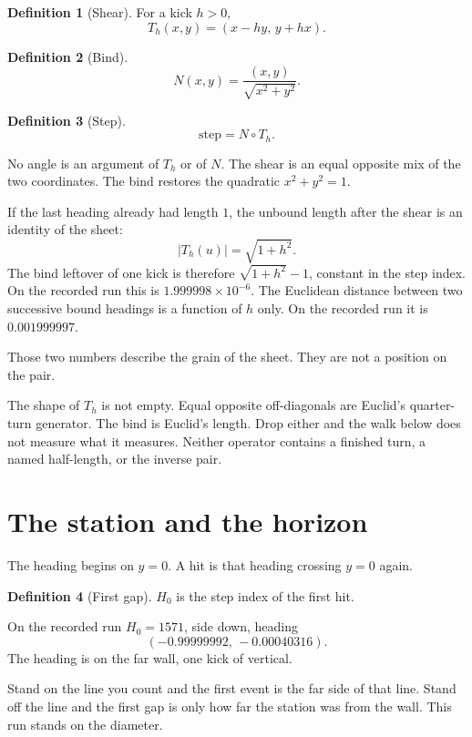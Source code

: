 \documentclass[10pt,a4paper]{article}
\theoremstyle{plain}
\theoremstyle{definition}
\newtheorem{definition}{Definition}
\theoremstyle{remark}
\begin{document}
\begin{definition}[Shear]
For a kick \(h>0\),
\[
T_h(x,y)=(x-hy,\,y+hx).
\]
\end{definition}

\begin{definition}[Bind]
\[
N(x,y)=\frac{(x,y)}{\sqrt{x^2+y^2}}.
\]
\end{definition}

\begin{definition}[Step]
\[
\mathrm{step}=N\circ T_h.
\]
\end{definition}

No angle is an argument of \(T_h\) or of \(N\).
The shear is an equal opposite mix of the two coordinates.
The bind restores the quadratic \(x^2+y^2=1\).

If the last heading already had length \(1\), the unbound length after the shear is an identity of the sheet:
\[
\bigl|T_h(u)\bigr|=\sqrt{1+h^2}.
\]
The bind leftover of one kick is therefore \(\sqrt{1+h^2}-1\), constant in the step index.
On the recorded run this is \(1.999998\times 10^{-6}\).
The Euclidean distance between two successive bound headings is a function of \(h\) only.
On the recorded run it is \(0.001999997\).

Those two numbers describe the grain of the sheet.
They are not a position on the pair.

The shape of \(T_h\) is not empty.
Equal opposite off-diagonals are Euclid's quarter-turn generator.
The bind is Euclid's length.
Drop either and the walk below does not measure what it measures.
Neither operator contains a finished turn, a named half-length, or the inverse pair.

\section{The station and the horizon}

The heading begins on \(y=0\).
A hit is that heading crossing \(y=0\) again.

\begin{definition}[First gap]
\(H_0\) is the step index of the first hit.
\end{definition}

On the recorded run \(H_0=1571\), side down, heading
\[
(-0.99999992,\,-0.00040316).
\]
The heading is on the far wall, one kick of vertical.

Stand on the line you count and the first event is the far side of that line.
Stand off the line and the first gap is only how far the station was from the wall.
This run stands on the diameter.
\end{document}
